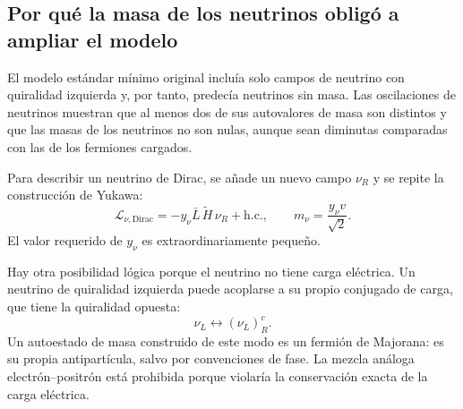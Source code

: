 \subsection{Por qué la masa de los neutrinos obligó a ampliar el modelo}

El modelo estándar mínimo original incluía solo campos de neutrino con quiralidad izquierda y, por tanto, predecía neutrinos sin masa. Las oscilaciones de neutrinos muestran que al menos dos de sus autovalores de masa son distintos y que las masas de los neutrinos no son nulas, aunque sean diminutas comparadas con las de los fermiones cargados.

\begin{classroomqa}
\end{classroomqa}

Para describir un neutrino de Dirac, se añade un nuevo campo \(\nu_R\) y se repite la construcción de Yukawa:
\begin{equation}
  \mathcal L_{\nu,\mathrm{Dirac}}
  =-y_\nu\bar L\,\widetilde H\,\nu_R+\mathrm{h.c.},
  \qquad
  m_\nu=\frac{y_\nu v}{\sqrt2}.
  \label{eq:l09-dirac-neutrino}
\end{equation}
El valor requerido de \(y_\nu\) es extraordinariamente pequeño.

Hay otra posibilidad lógica porque el neutrino no tiene carga eléctrica. Un neutrino de quiralidad izquierda puede acoplarse a su propio conjugado de carga, que tiene la quiralidad opuesta:
\begin{equation}
  \nu_L\longleftrightarrow(\nu_L)^c_R .
  \label{eq:l09-majorana-mixing}
\end{equation}
Un autoestado de masa construido de este modo es un fermión de Majorana: es su propia antipartícula, salvo por convenciones de fase. La mezcla análoga electrón--positrón está prohibida porque violaría la conservación exacta de la carga eléctrica.

\begin{classroomqa}
\end{classroomqa}


